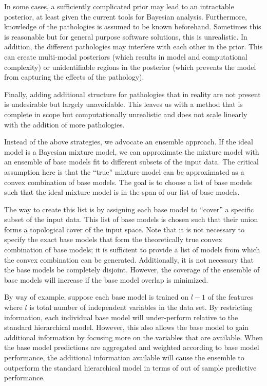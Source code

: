 \documentclass[12pt,titlepage]{mktg-article}
\begin{document}
In some cases, a sufficiently complicated prior may lead to an intractable posterior, at least given the current tools for Bayesian analysis. Furthermore, knowledge of the pathologies is assumed to be known beforehand. Sometimes this is reasonable but for general purpose software solutions, this is unrealistic. In addition, the different pathologies may interfere with each other in the prior. This can create multi-modal posteriors (which results in model and computational complexity) or unidentifiable regions in the posterior (which prevents the model from capturing the effects of the pathology).

Finally, adding additional structure for pathologies that in reality are not present is undesirable but largely unavoidable. This leaves us with a method that is complete in scope but computationally unrealistic and does not scale linearly with the addition of more pathologies.

Instead of the above strategies, we advocate an ensemble approach. If the ideal model is a Bayesian mixture model, we can approximate the mixture model with an ensemble of base models fit to different subsets of the input data. The critical assumption here is that the ``true'' mixture model can be approximated as a convex combination of base models. The goal is to choose a list of base models such that the ideal mixture model is in the span of our list of base models.

The way to create this list is by assigning each base model to ``cover'' a specific subset of the input data. This list of base models is chosen such that their union forms a topological cover of the input space. Note that it is not necessary to specify the exact base models that form the theoretically true convex combination of base models; it is sufficient to provide a list of models from which the convex combination can be generated. Additionally, it is not necessary that the base models be completely disjoint. However, the coverage of the ensemble of base models will increase if the base model overlap is minimized.

By way of example, suppose each base model is trained on \(l-1\) of the features where \(l\) is total number of independent variables in the data set. By restricting information, each individual base model will under-perform relative to the standard hierarchical model. However, this also allows the base model to gain additional information by focusing more on the variables that are available. When the base model predictions are aggregated and weighted according to base model performance, the additional information available will cause the ensemble to outperform the standard hierarchical model in terms of out of sample predictive performance.
\end{document}
